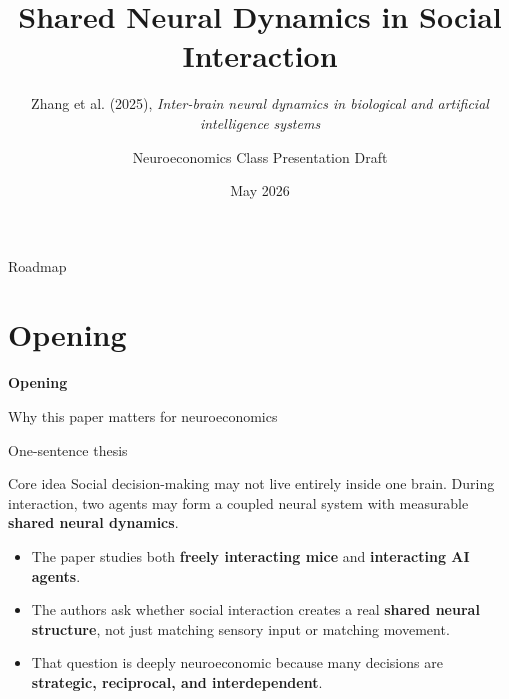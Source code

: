 \documentclass[aspectratio=169,11pt]{beamer}
\title{Shared Neural Dynamics in Social Interaction}
\subtitle{Zhang et al. (2025), \textit{Inter-brain neural dynamics in biological and artificial intelligence systems}}
\author{Neuroeconomics Class Presentation Draft}
\institute{Nature, 645, 991--1001}
\date{May 2026}
\newcommand{\sectiondivider}[2]{
  \begin{frame}[plain]
    \vfill
    {\color{accentblue}\LARGE\bfseries #1\par}
    \vspace{0.5em}
    {\large #2\par}
    \vfill
  \end{frame}
}
\begin{document}
\frame{\titlepage}

\begin{frame}{Roadmap}
\small
\tableofcontents[hideallsubsections]
\end{frame}

\section{Opening}
\sectiondivider{Opening}{Why this paper matters for neuroeconomics}

\begin{frame}{One-sentence thesis}
\begin{alertblock}{Core idea}
Social decision-making may not live entirely inside one brain. During interaction, two agents may form a coupled neural system with measurable \textbf{shared neural dynamics}.
\end{alertblock}
\vspace{0.4em}
\begin{itemize}
  \item The paper studies both \textbf{freely interacting mice} and \textbf{interacting AI agents}.
  \item The authors ask whether social interaction creates a real \textbf{shared neural structure}, not just matching sensory input or matching movement.
  \item That question is deeply neuroeconomic because many decisions are \textbf{strategic, reciprocal, and interdependent}.
\end{itemize}
\end{frame}
\end{document}
